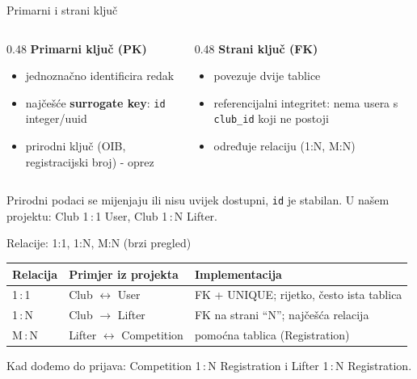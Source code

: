	\begin{frame}{Primarni i strani ključ}
		\begin{columns}[T]
			\begin{column}{0.48\textwidth}
				\textbf{Primarni ključ (PK)}
				\begin{itemize}
					\item jednoznačno identificira redak
					\item najčešće \textbf{surrogate key}: \texttt{id} integer/uuid
					\item prirodni ključ (OIB, registracijski broj) - oprez
				\end{itemize}
			\end{column}
			\begin{column}{0.48\textwidth}
				\textbf{Strani ključ (FK)}
				\begin{itemize}
					\item povezuje dvije tablice
					\item referencijalni integritet: nema usera s \texttt{club\_id} koji ne postoji
					\item određuje relaciju (1:N, M:N)
				\end{itemize}
			\end{column}
		\end{columns}

		\vspace{0.8em}
		Prirodni podaci se mijenjaju ili nisu uvijek dostupni, \texttt{id} je stabilan.
		U našem projektu: Club 1\,:\,1 User, Club 1\,:\,N Lifter.
	\end{frame}
	
	\begin{frame}{Relacije: 1:1, 1:N, M:N (brzi pregled)}
		\begin{center}
			\small
			\begin{tabular}{lll}
				\toprule
				\textbf{Relacija} & \textbf{Primjer iz projekta} & \textbf{Implementacija} \\
				\midrule
				1\,:\,1 & Club $\leftrightarrow$ User & FK + UNIQUE; rijetko, često ista tablica \\
				1\,:\,N & Club $\rightarrow$ Lifter & FK na strani \enquote{N}; najčešća relacija \\
				M\,:\,N & Lifter $\leftrightarrow$ Competition & pomoćna tablica (Registration) \\
				\bottomrule
			\end{tabular}
		\end{center}

		\vspace{0.6em}
		Kad dođemo do prijava: Competition 1\,:\,N Registration i Lifter 1\,:\,N Registration.
	\end{frame}
	
